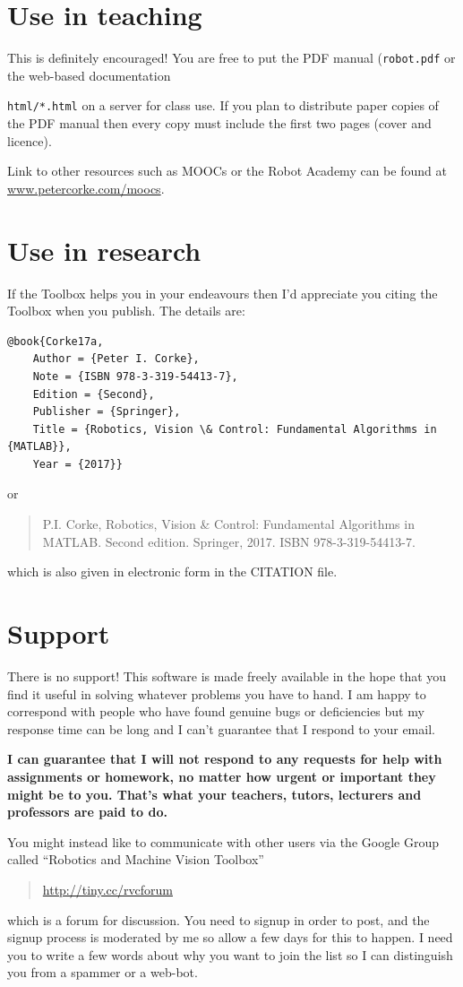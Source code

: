 \documentclass[a4paper,twoside]{report}
\begin{document}
\section{Use in teaching}
This is definitely encouraged!
You are free to put the PDF manual (\texttt{robot.pdf} or the web-based documentation {\texttt{html/*.html} on a server for class
use.
If you plan to distribute paper copies of the PDF manual then every copy must include the first two pages (cover and licence).

Link to other resources such as MOOCs or the Robot Academy can be found at \url{www.petercorke.com/moocs}.

\section{Use in research}
If the Toolbox helps you in your endeavours then I'd appreciate you citing the Toolbox when you publish.
The details are:
\begin{verbatim}
@book{Corke17a,
    Author = {Peter I. Corke},
    Note = {ISBN 978-3-319-54413-7},
    Edition = {Second},
    Publisher = {Springer},
    Title = {Robotics, Vision \& Control: Fundamental Algorithms in {MATLAB}},
    Year = {2017}}
\end{verbatim}
or
\begin{quote}
P.I. Corke, Robotics, Vision \& Control: Fundamental Algorithms in MATLAB. Second edition. Springer, 2017. ISBN 978-3-319-54413-7.
\end{quote}
which is also given in electronic form in the CITATION file.

\section{Support}
There is no support!  This software is made freely available in the hope that you find it useful in solving whatever problems
you have to hand.
I am happy to correspond with people who have found genuine
bugs or deficiencies but my response time can be long and I can't guarantee that I respond to your email.

\textbf{I can guarantee that I will not respond to any requests for help with assignments or homework, no matter
how urgent or important they might be to you.  That's what your teachers, tutors, lecturers and professors are paid to do.}

You might instead like to communicate with other users via 
the Google Group called ``Robotics and Machine Vision Toolbox'' 
\begin{quote}
\url{http://tiny.cc/rvcforum}
\end{quote}
which is a forum for discussion.
You need to signup in order to post, and the signup process is moderated by me so allow a few
days for this to happen.  I need you to write a few words about why you want to join the list
so I can distinguish you from a spammer or a web-bot.

}
\end{document}

